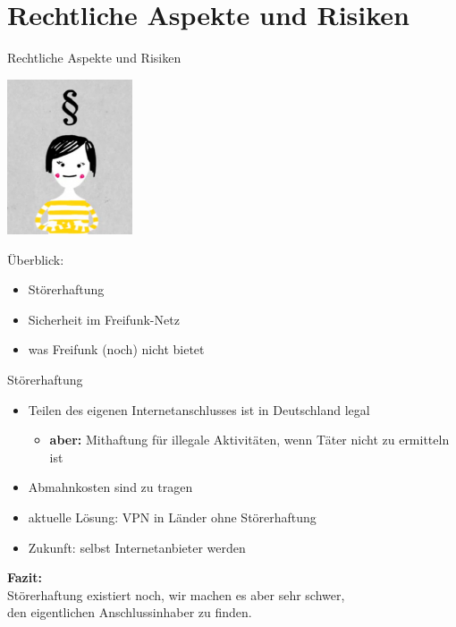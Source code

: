 \documentclass[10pt]{beamer}
\begin{document}
\section{Rechtliche Aspekte und Risiken}
\begin{frame}{Rechtliche Aspekte und Risiken}
\begin{Row}
\begin{Cell}{1}
\vspace{0.1cm}
\includegraphics[width=3.7cm]{images/recht}
\end{Cell}
\begin{Cell}{2}
\vspace{1cm}
Überblick:
\begin{itemize}[<+->]
\item Störerhaftung
\item Sicherheit im Freifunk-Netz
\item was Freifunk (noch) nicht bietet
\end{itemize}
\end{Cell}
\end{Row}
\end{frame}

\begin{frame}{Störerhaftung}
\begin{itemize}
\pause\item Teilen des eigenen Internetanschlusses ist in Deutschland legal
\begin{itemize}
	\pause\item \textbf{aber:} Mithaftung für illegale Aktivitäten, wenn Täter nicht zu ermitteln ist
\end{itemize}
\pause\item Abmahnkosten sind zu tragen
\vfill
\pause\item aktuelle Lösung: VPN in Länder ohne Störerhaftung
\pause\item Zukunft: selbst Internetanbieter werden
\end{itemize}
\vfill
\centering
\pause \textbf{Fazit:}\\Störerhaftung existiert noch, wir machen es aber sehr schwer,\\den eigentlichen Anschlussinhaber zu finden.

\end{frame}
\end{document}

